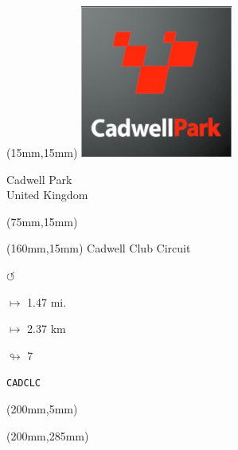 \begin{textblock*}{50mm}(15mm,15mm)%
\includegraphics[width=50mm]{LG/2015-05-20_00076.png}
\par Cadwell Park\\ United Kingdom
\end{textblock*}
\begin{textblock*}{80mm}(75mm,15mm)%
\end{textblock*}
\begin{textblock*}{40mm}(160mm,15mm)%
Cadwell Club Circuit
\par \Huge$\circlearrowleft$
\Large
\par$\mapsto$ 1.47 mi.
\par$\mapsto$ 2.37 km
\par$\looparrowright$ 7
\par\hfill\tiny\tt CADCLC\\
\end{textblock*}
\begin{textblock*}{20mm}(200mm,5mm)%
\fbox{\thepage}
\end{textblock*}
\begin{textblock*}{20mm}(200mm,285mm)%
\fbox{\thepage}
\end{textblock*}
